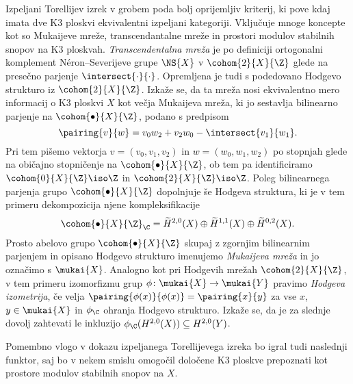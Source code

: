 Izpeljani Torellijev izrek v grobem poda bolj oprijemljiv kriterij, ki pove kdaj imata dve K3 ploskvi ekvivalentni izpeljani kategoriji.
Vključuje mnoge koncepte kot so Mukaijeve mreže, transcendantalne mreže in prostori modulov stabilnih snopov na K3 ploskvah. \emph{Transcendentalna mreža} je po definiciji ortogonalni komplement Néron--Severijeve grupe $\NS{X}$ v $\cohom{2}{X}{\Z}$ glede na presečno parjenje $\intersect{\cdot}{\cdot}$. Opremljena je tudi s podedovano Hodgevo strukturo iz $\cohom{2}{X}{\Z}$. Izkaže se, da ta mreža nosi ekvivalentno mero informacij o K3 ploskvi $X$ kot večja Mukaijeva mreža, ki jo sestavlja bilinearno parjenje na $\cohom{\bullet}{X}{\Z}$, podano s predpisom 
\[
    \pairing{v}{w} = v_0w_2 + v_2w_0 - \intersect{v_1}{w_1}.
\]
Pri tem pišemo vektorja $v = (v_0, v_1, v_2)$ in $w = (w_0, w_1, w_2)$ po stopnjah glede na običajno stopničenje na $\cohom{\bullet}{X}{\Z}$, ob tem pa identificiramo $\cohom{0}{X}{\Z} \iso \Z$ in $\cohom{2}{X}{\Z} \iso \Z$. Poleg bilinearnega parjenja grupo $\cohom{\bullet}{X}{\Z}$ dopolnjuje še Hodgeva struktura, ki je v tem primeru dekompozicija njene kompleksifikacije
\[
    \cohom{\bullet}{X}{\Z}_\C = \widetilde{H}^{2,0}(X) \oplus \widetilde{H}^{1,1}(X) \oplus \widetilde{H}^{0,2}(X).
\]
Prosto abelovo grupo $\cohom{\bullet}{X}{\Z}$ skupaj z zgornjim bilinearnim parjenjem in opisano Hodgevo strukturo imenujemo \emph{Mukaijeva mreža} in jo označimo s $\mukai{X}$. Analogno kot pri Hodgevih mrežah $\cohom{2}{X}{\Z}$, v tem primeru izomorfizmu grup ${\phi \colon \mukai{X} \to \mukai{Y}}$ pravimo \emph{Hodgeva izometrija}, če velja $\pairing{\phi(x)}{\phi(x)} = \pairing{x}{y}$ za vse $x$, $y \in \mukai{X}$ in $\phi_\C$ ohranja Hodgevo strukturo. Izkaže se, da je za slednje dovolj zahtevati le inkluzijo $\phi_\C(H^{2,0}(X)) \subseteq H^{2,0}(Y)$.

Pomembno vlogo v dokazu izpeljanega Torellijevega izreka bo igral tudi naslednji funktor, saj bo v nekem smislu omogočil določene K3 ploskve prepoznati kot prostore modulov stabilnih snopov na $X$.

